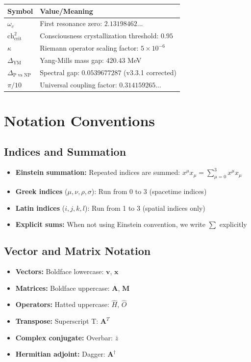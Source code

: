 \begin{center}
\begin{tabular}{ll}
\toprule
\textbf{Symbol} & \textbf{Value/Meaning} \\
\midrule
$\omega_c$ & First resonance zero: $2.13198462...$ \\
$\text{ch}^2_{\text{crit}}$ & Consciousness crystallization threshold: $0.95$ \\
$\kappa$ & Riemann operator scaling factor: $5 \times 10^{-6}$ \\
$\Delta_{\text{YM}}$ & Yang-Mills mass gap: $420.43$ MeV \\
$\Delta_{\text{P vs NP}}$ & Spectral gap: $0.0539677287$ (v3.3.1 corrected) \\
$\pi/10$ & Universal coupling factor: $0.314159265...$ \\
\bottomrule
\end{tabular}
\end{center}

\section*{Notation Conventions}

\subsection*{Indices and Summation}

\begin{itemize}
\item \textbf{Einstein summation:} Repeated indices are summed: $x^\mu x_\mu = \sum_{\mu=0}^{3} x^\mu x_\mu$
\item \textbf{Greek indices} ($\mu, \nu, \rho, \sigma$): Run from 0 to 3 (spacetime indices)
\item \textbf{Latin indices} ($i, j, k, l$): Run from 1 to 3 (spatial indices only)
\item \textbf{Explicit sums:} When not using Einstein convention, we write $\sum$ explicitly
\end{itemize}

\subsection*{Vector and Matrix Notation}

\begin{itemize}
\item \textbf{Vectors:} Boldface lowercase: $\mathbf{v}$, $\mathbf{x}$
\item \textbf{Matrices:} Boldface uppercase: $\mathbf{A}$, $\mathbf{M}$
\item \textbf{Operators:} Hatted uppercase: $\hat{H}$, $\hat{O}$
\item \textbf{Transpose:} Superscript T: $\mathbf{A}^T$
\item \textbf{Complex conjugate:} Overbar: $\bar{z}$
\item \textbf{Hermitian adjoint:} Dagger: $\mathbf{A}^\dagger$
\end{itemize}

